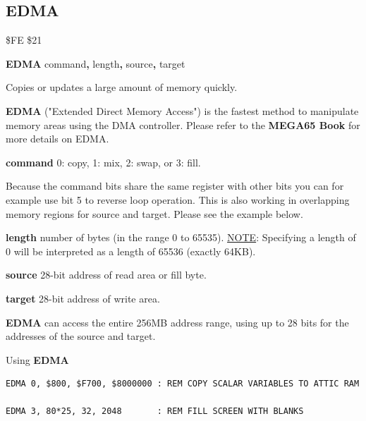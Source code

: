 \subsection{EDMA}
\label{BASIC 65 Commands!EDMA}
\begin{description}[leftmargin=2cm,style=nextline]
\item [Token:]    \$FE \$21

\item [Format:]   {\bf EDMA} command{\bf,} length{\bf,} source{\bf,} target

\item [Usage:]    Copies or updates a large amount of memory quickly.

                  {\bf EDMA} ("Extended Direct Memory Access") is the fastest method to manipulate memory areas using the DMA controller. Please refer to \ifdefined\printmanual
                     the {\bf MEGA65 Book}
                  \else
                  \fi
                  for more details on EDMA.

                  {\bf command} 0: copy, 1: mix, 2: swap, or 3: fill.

                  Because the command bits share the same register with other bits you can for example use bit 5 to reverse loop operation. This is also working in overlapping memory regions for source and target. Please see the example below.

                  {\bf length} number of bytes (in the range 0 to 65535). \underline{NOTE}: Specifying a length of 0 will be interpreted as a length of 65536 (exactly 64KB).

                  {\bf source} 28-bit address of read area or fill byte.

                  {\bf target} 28-bit address of write area.

\item [Remarks:]  {\bf EDMA} can access the entire 256MB address range, using up to 28 bits for the addresses of the source and target.

\item [Examples:] Using {\bf EDMA}

\begin{tcolorbox}[colback=black,coltext=white]
\verbatimfont{\codefont}
\begin{verbatim}
EDMA 0, $800, $F700, $8000000 : REM COPY SCALAR VARIABLES TO ATTIC RAM

EDMA 3, 80*25, 32, 2048       : REM FILL SCREEN WITH BLANKS


\end{verbatim}
\end{tcolorbox}
\end{description}
